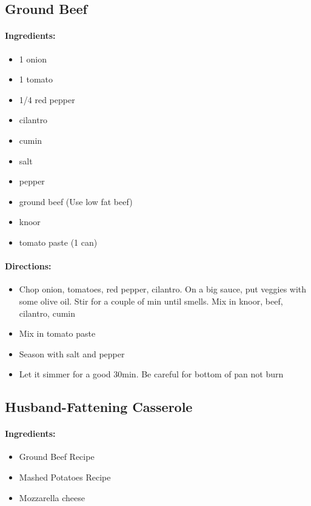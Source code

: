 \documentclass{article}
\begin{document}
\subsection{Ground Beef}

\paragraph{Ingredients:}
\begin{itemize}
    \item 1 onion
    \item 1 tomato
    \item 1/4 red pepper
    \item cilantro
    \item cumin
    \item salt
    \item pepper
    \item ground beef (Use low fat beef)
    \item knoor
    \item tomato paste (1 can)
\end{itemize}

\paragraph{Directions:}
\begin{itemize}
    \item Chop onion, tomatoes, red pepper, cilantro. On a big sauce, put veggies with some olive oil. Stir for a couple of min until smells. Mix in knoor, beef, cilantro, cumin
    \item Mix in tomato paste
    \item Season with salt and pepper
    \item Let it simmer for a good 30min. Be careful for bottom of pan not burn
\end{itemize}

\subsection{Husband-Fattening Casserole}

\paragraph{Ingredients:}
\begin{itemize}
    \item Ground Beef Recipe
    \item Mashed Potatoes Recipe
    \item Mozzarella cheese
\end{itemize}
\end{document}
